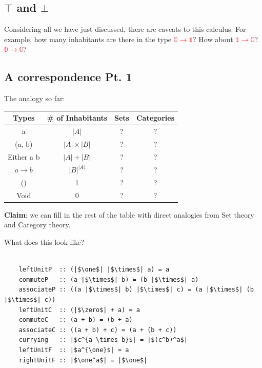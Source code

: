 \documentclass[tikz]{beamer}
\newcommand{\zero}{\bm{\mathbb{0}}}
\newcommand{\one}{\bm{\mathbb{1}}}
\newcommand{\mred}[1]{\textcolor{red}{$#1$}}
\theoremstyle{definition}
\begin{document}
\subsection{$\top$ and $\bot$}

\frame
{
	Considering all we have just discussed, there are caveats to this calculus. For example, how many inhabitants are there in the type \mred{\zero \to \one}? How about \mred{\one \to \zero}? \mred{\zero \to \zero}?
}

\subsection{A correspondence Pt. 1}
\frame
{
	The analogy so far: 
	
	\begin{center}
		\begin{tabular}{|c|c|c|c|}
			\hline
			Types & \# of Inhabitants  & Sets & Categories \\
			\hline a       & $|A|$ & ?  & ? \\
			(a, b) &  $|A| \times |B| $ & ? & ? \\
			Either a b & $|A| + |B|$ & ? & ? \\
			$a \to b$ & $|B|^{|A|}$ & ? & ? \\
			() & 1 & ? & ? \\
			Void & 0 & ? & ? \\ \hline
		\end{tabular}
	\end{center}

}

\frame
{ 
	\textbf{Claim}: we can fill in the rest of the table with direct analogies from Set theory and Category theory. 
}


\begin{frame}[fragile]
	What does this look like?
	
	\begin{center}
	\begin{verbatim}
	
	leftUnitP  :: (|$\one$| |$\times$| a) = a
	commuteP   :: (a |$\times$| b) = (b |$\times$| a)
	associateP :: ((a |$\times$| b) |$\times$| c) = (a |$\times$| (b |$\times$| c))
	leftUnitC  :: (|$\zero$| + a) = a
	commuteC   :: (a + b) = (b + a)
	associateC :: ((a + b) + c) = (a + (b + c))
	currying   :: |$c^{a \times b}$| = |$(c^b)^a$|
	leftUnitF  :: |$a^{\one}$| = a
	rightUnitF :: |$\one^a$| = |$\one$|
	\end{verbatim}
	
	\end{center}
\end{frame}
\end{document}
